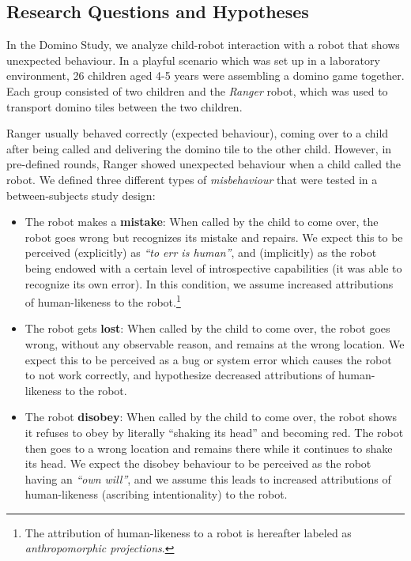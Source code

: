 \documentclass{sig-alternate}
\begin{document}
\subsection{Research Questions and Hypotheses}

In the Domino Study, we analyze child-robot interaction with a robot that shows
unexpected behaviour. In a playful scenario which was set up in a laboratory
environment, 26 children aged 4-5 years were assembling a domino game together.
Each group consisted of two children and the \emph{Ranger} robot, which was used
to transport domino tiles between the two children.

Ranger usually behaved correctly (expected behaviour), coming over to a child
after being called and delivering the domino tile to the other child. However,
in pre-defined rounds, Ranger showed unexpected behaviour when a child called the
robot. We defined three different types of \textit{misbehaviour} that were tested
in a between-subjects study design:

\begin{itemize}

    \item The robot makes a \textbf{mistake}: When called by the child to come
        over, the robot goes wrong but recognizes its mistake and repairs. We
        expect this to be perceived (explicitly) as \textit{``to err is
        human''}, and (implicitly) as the robot being endowed with a certain
        level of introspective capabilities (it was able to recognize its own
        error). In this condition, we assume increased attributions of
        human-likeness to the robot.\footnote{The attribution of human-likeness
            to a robot is hereafter labeled as \textit{anthropomorphic
        projections}.} 

    \item The robot gets \textbf{lost}: When called by the child to come over,
    the robot goes wrong, without any observable reason, and remains at the
    wrong location. We expect this to be perceived as a bug or system error
    which causes the robot to not work correctly, and hypothesize decreased
    attributions of human-likeness to the robot.

    \item The robot \textbf{disobey}: When called by the child to come over, the
    robot shows it refuses to obey by literally ``shaking its head'' and
    becoming red. The robot then goes to a wrong location and remains there
    while it continues to shake its head. We expect the disobey behaviour to be
    perceived as the robot having an \textit{``own will''}, and we assume this
    leads to increased attributions of human-likeness (ascribing intentionality)
    to the robot.

\end{itemize}
\end{document}
